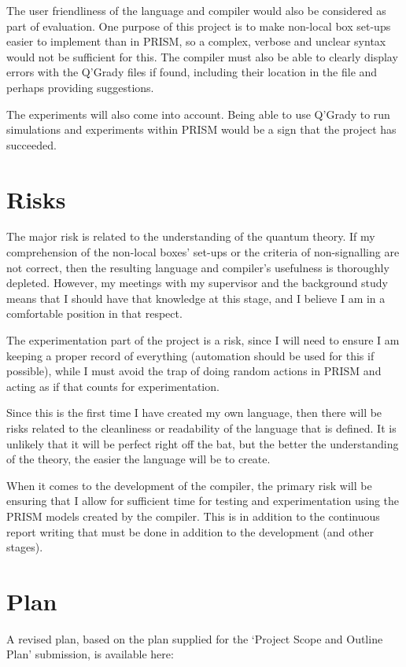 \documentclass[11pt, a4paper]{article}
\begin{document}
The user friendliness of the language and compiler would also be considered as
part of evaluation. One purpose of this project is to make non-local box set-ups
easier to implement than in PRISM, so a complex, verbose and unclear syntax
would not be sufficient for this. The compiler must also be able to clearly
display errors with the Q'Grady files if found, including their location in the
file and perhaps providing suggestions.

The experiments will also come into account. Being able to use Q'Grady to run
simulations and experiments within PRISM would be a sign that the project has
succeeded.


\section{Risks} %
\label{sec:risks}
The major risk is related to the understanding of the quantum theory. If my 
comprehension of the non-local boxes' set-ups or the criteria of non-signalling
are not correct, then the resulting language and compiler's usefulness is
thoroughly depleted. However, my meetings with my supervisor and the background
study means that I should have that knowledge at this stage, and I believe I am
in a comfortable position in that respect.

The experimentation part of the project is a risk, since I will need to ensure I
am keeping a proper record of everything (automation should be used for this if
possible), while I must avoid the trap of doing random actions in PRISM and
acting as if that counts for experimentation.

Since this is the first time I have created my own language, then there will be
risks related to the cleanliness or readability of the language that is defined.
It is unlikely that it will be perfect right off the bat, but the better the
understanding of the theory, the easier the language will be to create.

When it comes to the development of the compiler, the primary risk will be
ensuring that I allow for sufficient time for testing and experimentation using
the PRISM models created by the compiler. This is in addition to the continuous
report writing that must be done in addition to the development (and other
stages).


\section{Plan} %
\label{sec:plan}
A revised plan, based on the plan supplied for the `Project Scope and Outline
Plan' submission, is available here:
\end{document}
